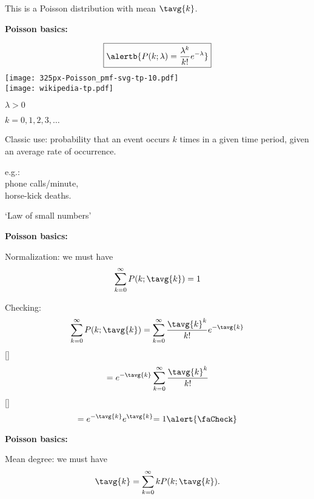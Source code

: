 \begin{frame}[label=]
\begin{frame}[label=]
\begin{frame}[label=]
\begin{frame}[label=]
\begin{frame}[label=]
\begin{frame}[label=]
\begin{frame}[label=]
\begin{frame}[label=]
    This is a 
    {Poisson distribution}
    with mean $\tavg{k}$.
  


\begin{frame}[label=]
  \textbf{Poisson basics:}


      
    $$
    \boxed{
      \alertb{
      P(k;\lambda)
      =
      \frac{\lambda^k}
      {k!}
      e^{-\lambda}}
  }
    $$
    \bigskip
    \texttt{[image: 325px-Poisson\_pmf-svg-tp-10.pdf]}\\
    \mbox{}\hfill\texttt{[image: wikipedia-tp.pdf]}
    
    
     
      $\lambda > 0$
     
      $k=0, 1, 2, 3, \ldots$
     
      Classic use: probability
      that an event occurs $k$ 
      times in a given time period,
      given an average rate of occurrence.
     
      e.g.:\\ 
      phone calls/minute,\\ 
      horse-kick deaths.
     
      `Law of small numbers'
    
  


\begin{frame}[label=]
  \textbf{Poisson basics:}

  
   
    Normalization: we must have
    $$ 
    \sum_{k=0}^\infty
    P(k;\tavg{k})
    = 1
    $$
  
    Checking:
    $$ 
    \sum_{k=0}^\infty
    P(k;\tavg{k})
    =
    \sum_{k=0}^\infty
    \frac{\tavg{k}^k}
    {k!}
    e^{-\tavg{k}}
    $$
  []
    $$
    =
    e^{-\tavg{k}}
    \sum_{k=0}^\infty
    \frac{\tavg{k}^k}
    {k!}
    $$
  []
    $$
    =
    e^{-\tavg{k}}
    e^{\tavg{k}}
    {
      =
      1
      \alert{\faCheck}
    }
    $$
  



\begin{frame}[label=]
  \textbf{Poisson basics:}

  \small
  
   Mean degree: we must have
    $$
    \tavg{k}
    =
    \sum_{k=0}^\infty
    k
    P(k;\tavg{k}).
    $$
  

\end{frame}
\end{frame}
\end{frame}
\end{frame}
\end{frame}
\end{frame}
\end{frame}
\end{frame}
\end{frame}
\end{frame}
\end{frame}
